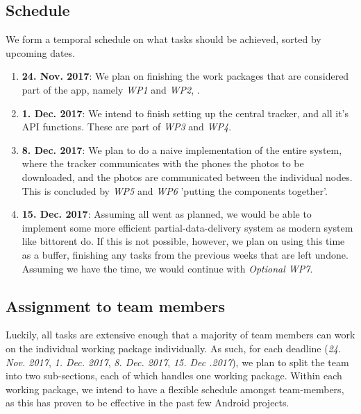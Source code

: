 \documentclass{report}
\begin{document}
\subsection{Schedule}
We form a temporal schedule on what tasks should be achieved, sorted by upcoming dates.
\begin{enumerate}
\item  \textbf{24. Nov. 2017}: We plan on finishing the work packages that are considered part of the app, namely \textit{WP1} and \textit{WP2}, .
\item  \textbf{1. Dec. 2017}: We intend to finish setting up the central tracker, and all it's API functions. These are part of \textit{WP3} and \textit{WP4}.
\item \textbf{8. Dec. 2017}: We plan to do a naive implementation of the entire system, where the tracker communicates with the phones the photos to be downloaded, and the photos are communicated between the individual nodes. This is concluded by \textit{WP5} and  \textit{WP6} 'putting the components together'.
\item \textbf{15. Dec. 2017}: Assuming all went as planned, we would be able to implement some more efficient partial-data-delivery system as modern system like bittorent do. If this is not possible, however, we plan on using this time as a buffer, finishing any tasks from the previous weeks that are left undone. Assuming we have the time, we would continue with \textit{Optional WP7}.
\end{enumerate}


\subsection{Assignment to team members}

Luckily, all tasks are extensive enough that a majority of team members can work on the individual working package individually. As such, for each deadline (\textit{24. Nov. 2017}, \textit{1. Dec. 2017}, \textit{8. Dec. 2017}, \textit{15. Dec .2017}), we plan to split the team into two sub-sections, each of which handles one working package. Within each working package, we intend to have a flexible schedule amongst team-members, as this has proven to be effective in the past few Android projects.



\end{document}

